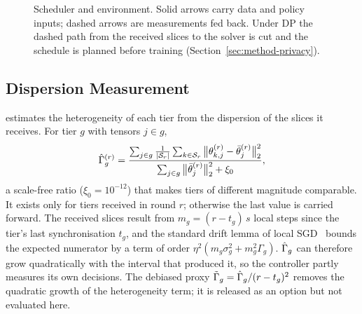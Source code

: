 \begin{figure}[t]
\caption{Scheduler and environment. Solid arrows carry data and policy inputs; dashed arrows are measurements fed back. Under DP the dashed path from the received slices to the solver is cut and the schedule is planned before training (Section~\ref{sec:method-privacy}).}
\label{fig:arch}
\end{figure}

\subsection{Dispersion Measurement}
\tierfed{} estimates the heterogeneity of each tier from the dispersion of the slices it receives. For tier $g$ with tensors $j\in g$,
\begin{equation}
\hat\Gamma_g^{(r)}=\frac{\sum_{j\in g}\frac1{|\mathcal S_r|}\sum_{k\in\mathcal S_r}\big\|\theta_{k,j}^{(r)}-\bar\theta_j^{(r)}\big\|_2^2}{\sum_{j\in g}\big\|\bar\theta_j^{(r)}\big\|_2^2+\xi_0},
\label{eq:gammahat}
\end{equation}
a scale-free ratio ($\xi_0=10^{-12}$) that makes tiers of different magnitude comparable. It exists only for tiers received in round $r$; otherwise the last value is carried forward. The received slices result from $m_g=(r-t_g)\,s$ local steps since the tier's last synchronisation $t_g$, and the standard drift lemma of local SGD~\cite{stich2019,khaled2020} bounds the expected numerator by a term of order $\eta^2(m_g\sigma_g^2+m_g^2\Gamma_g)$. $\hat\Gamma_g$ can therefore grow quadratically with the interval that produced it, so the controller partly measures its own decisions. The debiased proxy $\tilde\Gamma_g=\hat\Gamma_g/(r-t_g)^2$ removes the quadratic growth of the heterogeneity term; it is released as an option but not evaluated here.


